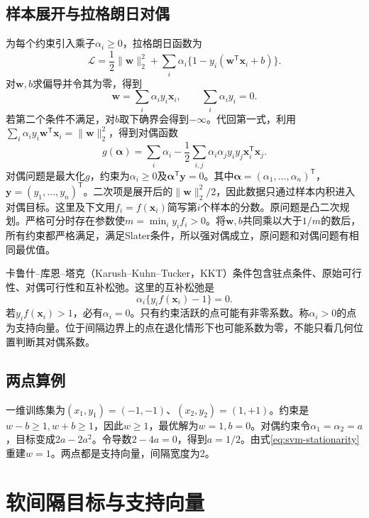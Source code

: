 \subsection{样本展开与拉格朗日对偶}
为每个约束引入乘子$\alpha_i\ge0$，拉格朗日函数为
\begin{equation}
 \mathcal L=\frac12\|\bm w\|_2^2
 +\sum_i\alpha_i\{1-y_i(\bm w^{\mathsf T}\bm x_i+b)\}.
\end{equation}
对$\bm w,b$求偏导并令其为零，得到
\begin{equation}
 \bm w=\sum_i\alpha_i y_i\bm x_i,
 \qquad \sum_i\alpha_i y_i=0.
 \label{eq:svm-stationarity}
\end{equation}
若第二个条件不满足，对$b$取下确界会得到$-\infty$。代回第一式，利用$\sum_i\alpha_i y_i\bm w^{\mathsf T}\bm x_i=\|\bm w\|_2^2$，得到对偶函数
\begin{equation}
 g(\bm\alpha)=\sum_i\alpha_i-
 \frac12\sum_{i,j}\alpha_i\alpha_j y_i y_j\bm x_i^{\mathsf T}\bm x_j.
\end{equation}
对偶问题是最大化$g$，约束为$\alpha_i\ge0$及$\bm\alpha^{\mathsf T}\bm y=0$。其中$\bm\alpha=(\alpha_1,\ldots,\alpha_n)^{\mathsf T}$，$\bm y=(y_1,\ldots,y_n)^{\mathsf T}$。二次项是展开后的$\|\bm w\|_2^2/2$，因此数据只通过样本内积进入对偶目标。这里及下文用$f_i=f(\bm x_i)$简写第$i$个样本的分数。原问题是凸二次规划。严格可分时存在参数使$m=\min_i y_i f_i>0$。将$\bm w,b$共同乘以大于$1/m$的数后，所有约束都严格满足，满足Slater条件，所以强对偶成立，原问题和对偶问题有相同最优值。

卡鲁什--库恩--塔克（Karush--Kuhn--Tucker，KKT）条件包含驻点条件、原始可行性、对偶可行性和互补松弛。这里的互补松弛是
\begin{equation}
 \alpha_i\{y_if(\bm x_i)-1\}=0.
 \label{eq:svm-hard-kkt}
\end{equation}
若$y_if(\bm x_i)>1$，必有$\alpha_i=0$。只有约束活跃的点可能有非零系数。称$\alpha_i>0$的点为支持向量。位于间隔边界上的点在退化情形下也可能系数为零，不能只看几何位置判断其对偶系数。

\subsection{两点算例}
一维训练集为$(x_1,y_1)=(-1,-1)$、$(x_2,y_2)=(1,+1)$。约束是$w-b\ge1,w+b\ge1$，因此$w\ge1$，最优解为$w=1,b=0$。对偶约束令$\alpha_1=\alpha_2=a$，目标变成$2a-2a^2$。令导数$2-4a=0$，得到$a=1/2$。由式\eqref{eq:svm-stationarity}重建$w=1$。两点都是支持向量，间隔宽度为2。

\section{软间隔目标与支持向量}
